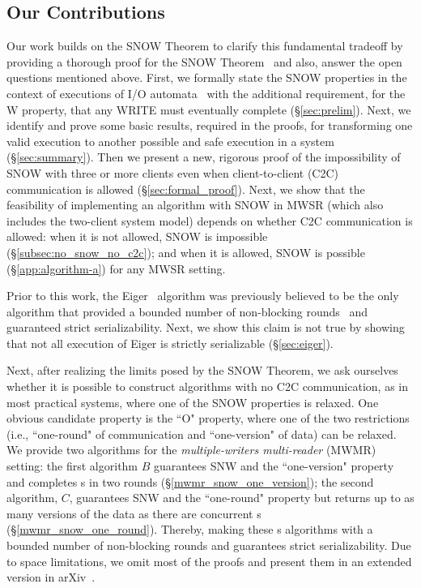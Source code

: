 \subsection{Our Contributions}
Our work builds on the SNOW Theorem to clarify this fundamental tradeoff by providing a thorough proof for the SNOW Theorem~\cite{SNOW2016} and also, answer the open questions mentioned above. 
First, we formally state the SNOW properties in the context of executions of I/O automata~\cite{Lynch1996}  with the additional requirement, for the W property, that any WRITE must eventually complete (\S\ref{sec:prelim}). Next, we identify and prove some basic results, required in the proofs, for transforming one valid execution to another possible and safe execution in a \rot{} system (\S\ref{sec:summary}). 
Then we present a new, rigorous proof of the impossibility of SNOW with three or more clients even when client-to-client (C2C) communication is allowed (\S\ref{sec:formal_proof}).
Next, we show that the feasibility of implementing an algorithm with SNOW in MWSR (which also includes the two-client system model) depends on whether C2C communication is allowed:
when it is not allowed, SNOW is impossible (\S\ref{subsec:no_snow_no_c2c}); and when it is allowed, SNOW is possible (\S\ref{app:algorithm-a}) for any MWSR setting.

Prior to this work, the Eiger~\cite{Lloyd:nsdi2013} algorithm was previously believed to be the only algorithm that provided a bounded number of non-blocking rounds~\cite{Lloyd:nsdi2013} and guaranteed strict serializability. 
Next, we show this claim is not true by showing that not all execution of Eiger is strictly serializable (\S\ref{sec:eiger}).

Next, after realizing the limits posed by the SNOW Theorem, we ask ourselves whether it is possible to construct \rot{} algorithms with no C2C communication, as in most practical systems, where one of the SNOW properties is relaxed. One obvious candidate property is the ``O" property, where one of the two restrictions (i.e., ``one-round" of communication and ``one-version" of data) can be relaxed. We provide two algorithms for the \emph{multiple-writers multi-reader} (MWMR) setting: the first algorithm $B$ guarantees SNW and the ``one-version" property and completes \rot{}s in two rounds (\S\ref{mwmr_snow_one_version}); the second algorithm, $C$, guarantees SNW and the ``one-round" property but returns up to as many versions of the data as there are concurrent \wot{}s
(\S\ref{mwmr_snow_one_round}). Thereby, making these \rot{}s algorithms with a bounded number of non-blocking rounds and guarantees strict serializability. 
%
Due to space limitations, we omit most of the proofs and present them in an extended version in arXiv~\cite{konwar2018snow}.

